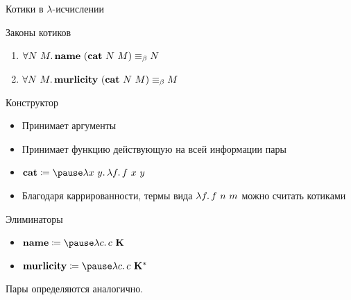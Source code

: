     \begin{frame}[fragile]{Котики в $\lambda$-исчислении}
        \begin{block}{Законы котиков}
            \begin{enumerate}
                \item $\forall N~M\ldotp \mathbf{name}~(\mathbf{cat}~N~M) \equiv_\beta N$
                \item $\forall N~M\ldotp \mathbf{murlicity}~(\mathbf{cat}~N~M) \equiv_\beta M$
            \end{enumerate}
        \end{block}
        \pause
        \begin{block}{Конструктор}
            \begin{itemize}
                \item Принимает аргументы
                \item Принимает функцию действующую на всей информации пары
                \item $\term{cat} \termdef \pause \lambda x~y\ldotp \lambda f \ldotp f \ap x \ap y$
                \item Благодаря каррированности, термы вида $\lambda f\ldotp f ~ n ~ m$ можно считать котиками
            \end{itemize}
        \end{block}
        \pause
        \begin{block}{Элиминаторы}
            \begin{itemize}
                \item $\term{name} \termdef \pause \lambda c \ldotp c \ap \term{K}$
                \item $\term{murlicity} \termdef \pause \lambda c \ldotp c \ap \term{K}^*$
            \end{itemize}
        \end{block}
        Пары определяются аналогично.
    \end{frame}


